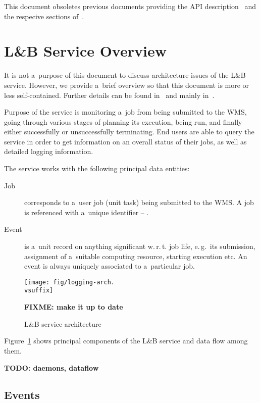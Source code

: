 \documentclass{egee}
\def\vsuffix{eps}
\def\vsuffix{pdf}
\def\LB{L\&B\xspace}
\def\eg{e.\,g.\xspace}
\def\wrt{w.\,r.\,t.\xspace}
\begin{document}
This document obsoletes previous documents providing the API
description~\cite{lbdraft,lbadvanced} and the respecive sections
of~\cite{lbdraft2}.

\newpage

\section{\LB Service Overview}
It is not a~purpose of this document to discuss architecture issues of
the \LB service.
However, we provide a~brief overview so that this document is more or less
self-contained.
Further details can be found in~\cite{lbdraft2} and mainly in~\cite{lbarch}.

Purpose of the service is monitoring a~job from being submitted to the WMS,
going through various stages of planning its execution, being run,
and finally either successfully or unsuccessfully terminating.
End users are able to query the service in order to get information on
an overall status of their jobs, as well as detailed logging information.

The service works with the following principal data entities:
\begin{description}
\item[Job] corresponds to a~user job (unit task) being submitted to the WMS.
A job is referenced with a~unique identifier -- \jobid.
\item[Event] is a~unit record on anything significant \wrt job life, \eg\ its
submission, assignment of a~suitable computing resource, starting execution
etc. An event is always uniquely associated to a~particular job.
\end{description}

\begin{figure}
\begin{center}
\texttt{[image: fig/logging-arch.\\vsuffix]}
\end{center}
\caption{\LB service architecture}
\textbf{FIXME: make it up to date}
\label{f:arch}
\end{figure}

Figure~\ref{f:arch} shows principal components of the \LB service
and data flow among them. 

\textbf{TODO: daemons, dataflow}

\subsection{Events}
\label{s:events}
\end{document}
